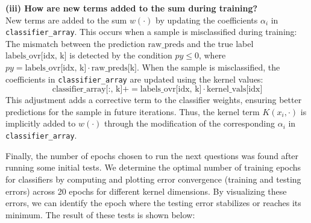 \documentclass[final,3p,times,12pt]{article}
\begin{document}
\vspace{0.5cm}

\noindent \textbf{(iii) How are new terms added to the sum during training?} \\
New terms are added to the sum \( w(\cdot) \) by updating the coefficients \( \alpha_i \) in \texttt{classifier\_array}. This occurs when a sample is misclassified during training: The mismatch between the prediction \( \text{raw\_preds} \) and the true label \( \text{labels\_ovr[idx, k]} \) is detected by the condition \( py \leq 0 \), where \( py = \text{labels\_ovr[idx, k]} \cdot \text{raw\_preds[k]} \). When the sample is misclassified, the coefficients in \texttt{classifier\_array} are updated using the kernel values:
\[
\text{classifier\_array[:, k]} += \text{labels\_ovr[idx, k]} \cdot \text{kernel\_vals[idx]}
\]
This adjustment adds a corrective term to the classifier weights, ensuring better predictions for the sample in future iterations. Thus, the kernel term \( K(x_i, \cdot) \) is implicitly added to \( w(\cdot) \) through the modification of the corresponding \( \alpha_i \) in \texttt{classifier\_array}.


\vspace{0.5cm}

Finally, the number of epochs chosen to run the next questions was found after running some initial tests. We determine the optimal number of training epochs for classifiers by computing and plotting error convergence (training and testing errors) across 20 epochs for different kernel dimensions. By visualizing these errors, we can identify the epoch where the testing error stabilizes or reaches its minimum. The result of these tests is shown below: 
\end{document}
